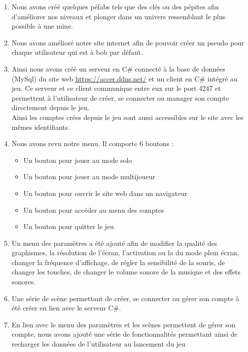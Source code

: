 \documentclass[titlepage, 13px, a4paper]{article}
\begin{document}
{\begin{enumerate}
	\item Nous avons créé quelques péfabs tels que des clés ou des pépites afin d’améliorer nos niveaux 
			et plonger dans un univers ressemblant le plus possible à une mine.	\\
	\item Nous avons amélioré notre site internet afin de pouvoir créer un pseudo pour chaque utilisateur qui est à bob par défaut.	\\
	\item Ainsi nous avons créé un serveur en C\# connecté à la base de données (MySql) du site web \url{https://accer.ddns.net/}
			et un client en C\# intégré au jeu. 
			Ce serveur et ce client communique entre eux sur le port 4247 et permettent à l’utilisateur de créer, se connecter ou
			manager son compte directement depuis le jeu. \\
			Ainsi les comptes crées depuis le jeu sont aussi accessibles sur le site avec les mêmes identifiants. \\
	\item Nous avons revu notre menu. Il comporte 6 boutons :
		{\begin{itemize}
			\item	Un bouton pour jouer au mode solo
			\item	Un bouton pour jouer au mode multijoueur
			\item	Un bouton pour ouvrir le site web dans un navigateur
			\item	Un bouton pour accéder au menu des comptes
			\item	Un bouton pour quitter le jeu \\
		\end{itemize}} 
	\item Un menu des paramètres a été ajouté afin de modifier la qualité des graphismes, la résolution de l’écran, 
		l’activation ou la du mode plein écran, changer la fréquence d’affichage, de régler la sensibilité de la souris, 
		de changer les touches, de changer le volume sonore de la musique et des effets sonores. \\
	\item Une série de scène permettant de créer, se connecter ou gérer son compte à été créer en lien avec le serveur C\#. \newpage
	\item En lien avec le menu des paramètres et les scènes permettent de gérer son compte, 
		nous avons ajouté une série de fonctionnalités permettant ainsi de recharger les données de l’utilisateur au lancement du jeu 

\end{enumerate}}
\end{document}
